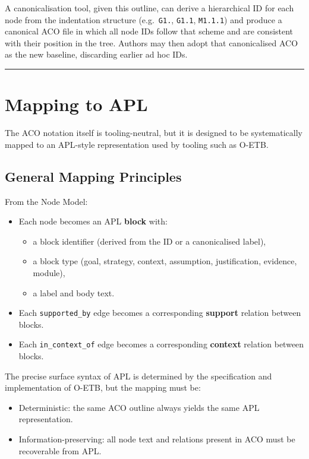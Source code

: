\documentclass[11pt]{article}
\begin{document}
A canonicalisation tool, given this outline, can derive a hierarchical ID for each node from the indentation structure (e.g.\ \texttt{G1.}, \texttt{G1.1}, \texttt{M1.1.1}) and produce a canonical ACO file in which all node IDs follow that scheme and are consistent with their position in the tree. Authors may then adopt that canonicalised ACO as the new baseline, discarding earlier ad hoc IDs.

\bigskip
\hrule
\bigskip

\section{Mapping to APL}

The ACO notation itself is tooling-neutral, but it is designed to be systematically mapped to an APL-style representation used by tooling such as O-ETB.

\subsection{General Mapping Principles}

From the Node Model:
\begin{itemize}[leftmargin=2em]
  \item Each node becomes an APL \textbf{block} with:
  \begin{itemize}[leftmargin=1.5em]
    \item a block identifier (derived from the ID or a canonicalised label),
    \item a block type (goal, strategy, context, assumption, justification, evidence, module),
    \item a label and body text.
  \end{itemize}

  \item Each \texttt{supported\_by} edge becomes a corresponding \textbf{support} relation between blocks.

  \item Each \texttt{in\_context\_of} edge becomes a corresponding \textbf{context} relation between blocks.
\end{itemize}

The precise surface syntax of APL is determined by the specification and implementation of O-ETB, but the mapping must be:
\begin{itemize}[leftmargin=2em]
  \item Deterministic: the same ACO outline always yields the same APL representation.
  \item Information-preserving: all node text and relations present in ACO must be recoverable from APL.
\end{itemize}
\end{document}
